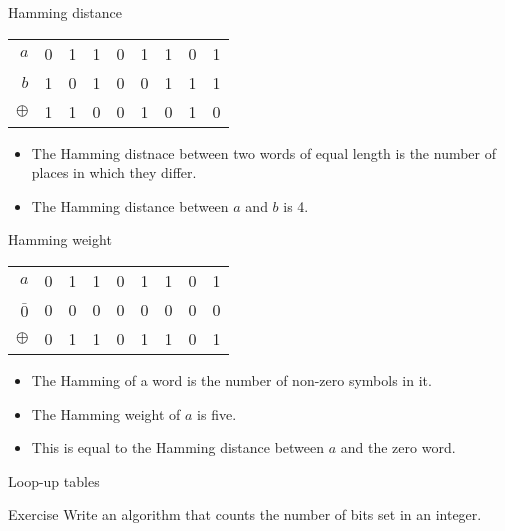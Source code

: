 \begin{frame}{Hamming distance}
  \begin{table}
    \centering
    \begin{tabular}{rcccccccc}
      \toprule
      $a$      & 0 & 1 & 1 & 0 & 1 & 1 & 0 & 1 \\
      $b$      & 1 & 0 & 1 & 0 & 0 & 1 & 1 & 1 \\
      \midrule
      $\oplus$ & 1 & 1 & 0 & 0 & 1 & 0 & 1 & 0 \\
      \bottomrule
    \end{tabular}
  \end{table}
  \begin{itemize}
    \item The Hamming distnace between two words of equal length is the number of places in which they differ.
    \item The Hamming distance between $a$ and $b$ is 4.
  \end{itemize}
\end{frame}

\begin{frame}{Hamming weight}
  \begin{table}
    \centering
    \begin{tabular}{rcccccccc}
      \toprule
      $a$      & 0 & 1 & 1 & 0 & 1 & 1 & 0 & 1 \\
      $\bar{0}$      & 0 & 0 & 0 & 0 & 0 & 0 & 0 & 0 \\
      \midrule
      $\oplus$ & 0 & 1 & 1 & 0 & 1 & 1 & 0 & 1 \\
      \bottomrule
    \end{tabular}
  \end{table}
  \begin{itemize}
    \item The Hamming of a word is the number of non-zero symbols in it.
    \item The Hamming weight of $a$ is five.
    \item This is equal to the Hamming distance between $a$ and the zero word.
  \end{itemize}
\end{frame}


\begin{frame}{Loop-up tables}
  \begin{exampleblock}{Exercise}
    Write an algorithm that counts the number of bits set in an integer.
  \end{exampleblock}
  \pause
  \begin{description}
    \setlength\itemsep{6mm}
    \item[Bit shifting]
    \item[Look-up table]
    \item[Kernighan]
    \item[popcount]
  \end{description}
\end{frame}